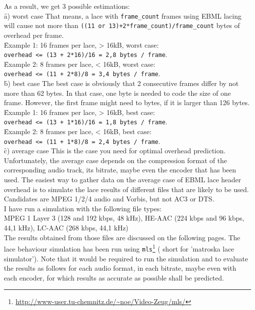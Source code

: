 \documentclass[12pt]{article}
\begin{document}
As a result, we get 3 possible estimations:\\[0.2cm]
\f{a) worst case} 
That means, a lace with \texttt{frame\_count} frames using EBML lacing will
cause not more than \texttt{((11 or 13)+2*frame\_count)/frame\_count} bytes of
overhead per frame.\\[0.2cm]
\f{Example 1:} 16 frames per lace,  > 16kB, worst case:\\
\texttt{overhead <= (13 + 2*16)/16 = 2,8 bytes / frame}.\\
\f{Example 2:} 8 frames per lace,  < 16kB, worst case:\\
\texttt{overhead <= (11 + 2*8)/8 = 3,4 bytes / frame}.\\[0.3cm]
\f{b) best case}
The best case is obviously that 2 consecutive frames differ by not more than 62
bytes. In that case, one byte is needed to code the size of one frame.
However, the first frame might need to bytes, if it is larger than 126
bytes.\\[0.2cm]
\f{Example 1:} 16 frames per lace,  > 16kB, best case:\\
\texttt{overhead <= (13 + 1*16)/16 = 1,8 bytes / frame}.\\
\f{Example 2:} 8 frames per lace,  < 16kB, best case:\\
\texttt{overhead <= (11 + 1*8)/8 = 2,4 bytes / frame}.\\[0.3cm]
\f{c) average case}
This is the case you need for optimal overhead prediction. Unfortunately,
the average case depends on the compression format of the corresponding
audio track, its bitrate, maybe even the encoder that has been used. The
easiest way to gather data on the average case of EBML lace header overhead
is to simulate the lace results of different files that are likely to be
used. Candidates are MPEG 1/2/4 audio and Vorbis, but not AC3 or DTS.\\
I have run a simulation with the following file types:\\
MPEG 1 Layer 3 (128 and 192 kbps, 48 kHz), HE-AAC (224 kbps and 96 kbps, 44,1 kHz),
LC-AAC (268 kbps, 44,1 kHz)\\[0.2cm]
The results obtained from those files are discussed on the following
pages. The lace behaviour simulation has been run using \texttt{mls}\footnote{\url{http://www-user.tu-chemnitz.de/~noe/Video-Zeug/mls/}} (
short for 'matroska lace simulator'). Note that it would be required to run the simulation and to evaluate the
results as follows for each audio format, in each bitrate, maybe even
with each encoder, for which results as accurate as possible shall be
predicted.
\end{document}
